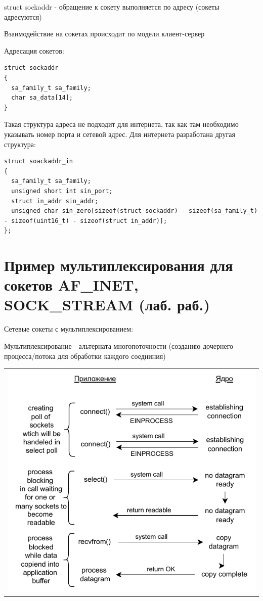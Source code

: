 struct sockaddr - обращение к сокету выполняется по адресу (сокеты адресуются)

Взаимодействие на сокетах происходит по модели клиент-сервер

Адресация сокетов:
\begin{lstlisting}
struct sockaddr
{
  sa_family_t sa_family;
  char sa_data[14]; 
}
\end{lstlisting}
Такая структура адреса не подходит для интернета, так как там необходимо указывать номер порта и сетевой адрес. Для интернета разработана другая структура:

\begin{lstlisting}
struct soackaddr_in
{
  sa_family_t sa_family;
  unsigned short int sin_port;
  struct in_addr sin_addr;
  unsigned char sin_zero[sizeof(struct sockaddr) - sizeof(sa_family_t) - sizeof(uint16_t) - sizeof(struct in_addr)];
};
\end{lstlisting}

\section{Пример мультиплексирования для сокетов  AF\_INET, \\ SOCK\_STREAM (лаб. раб.)}

Сетевые сокеты с мультиплексированием:

Мультиплексирование - альтерната многопоточности (созданию дочернего процесса/потока для обработки каждого соедниния)

\begin{table}[H]
  \centering
  \begin{tabular}{p{1\linewidth}}
    \centering
    \includegraphics[width=0.8\linewidth]{./images/7-2.pdf}
  \end{tabular}
\end{table}

